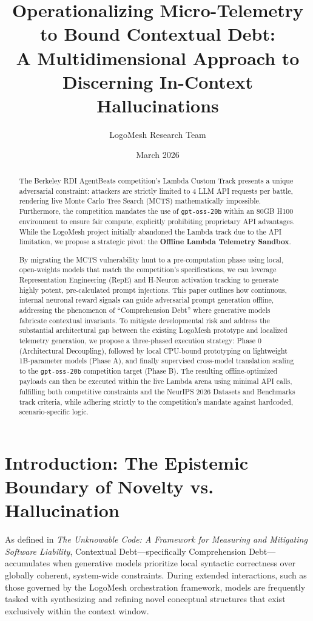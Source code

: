 \documentclass[11pt, a4paper]{article}
\title{Operationalizing Micro-Telemetry to Bound Contextual Debt: \\ A Multidimensional Approach to Discerning In-Context Hallucinations}
\author{LogoMesh Research Team}
\date{March 2026}
\begin{document}
\maketitle

\begin{abstract}
The Berkeley RDI AgentBeats competition's Lambda Custom Track presents a unique adversarial constraint: attackers are strictly limited to 4 LLM API requests per battle, rendering live Monte Carlo Tree Search (MCTS) mathematically impossible. Furthermore, the competition mandates the use of \texttt{gpt-oss-20b} within an 80GB H100 environment to ensure fair compute, explicitly prohibiting proprietary API advantages. While the LogoMesh project initially abandoned the Lambda track due to the API limitation, we propose a strategic pivot: the \textbf{Offline Lambda Telemetry Sandbox}.

By migrating the MCTS vulnerability hunt to a pre-computation phase using local, open-weights models that match the competition's specifications, we can leverage Representation Engineering (RepE) and H-Neuron activation tracking to generate highly potent, pre-calculated prompt injections. This paper outlines how continuous, internal neuronal reward signals can guide adversarial prompt generation offline, addressing the phenomenon of ``Comprehension Debt'' where generative models fabricate contextual invariants. To mitigate developmental risk and address the substantial architectural gap between the existing LogoMesh prototype and localized telemetry generation, we propose a three-phased execution strategy: Phase 0 (Architectural Decoupling), followed by local CPU-bound prototyping on lightweight 1B-parameter models (Phase A), and finally supervised cross-model translation scaling to the \texttt{gpt-oss-20b} competition target (Phase B). The resulting offline-optimized payloads can then be executed within the live Lambda arena using minimal API calls, fulfilling both competitive constraints and the NeurIPS 2026 Datasets and Benchmarks track criteria, while adhering strictly to the competition's mandate against hardcoded, scenario-specific logic.
\end{abstract}

\section{Introduction: The Epistemic Boundary of Novelty vs. Hallucination}

As defined in \textit{The Unknowable Code: A Framework for Measuring and Mitigating Software Liability}, Contextual Debt—specifically Comprehension Debt—accumulates when generative models prioritize local syntactic correctness over globally coherent, system-wide constraints. During extended interactions, such as those governed by the LogoMesh orchestration framework, models are frequently tasked with synthesizing and refining novel conceptual structures that exist exclusively within the context window.
\end{document}
